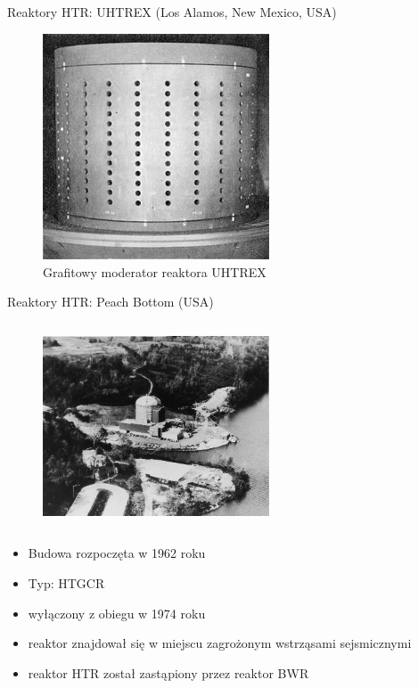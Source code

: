 \begin{frame}{Reaktory HTR: UHTREX (Los Alamos, New Mexico, USA)}
    \begin{figure}
        \centering
        \includegraphics[width=0.6\textwidth, frame]{images/UHTREX_Moderator_graphite.jpg}
        \caption{Grafitowy moderator reaktora UHTREX}
    \end{figure}
\end{frame}



\begin{columnframe}{Reaktory HTR: Peach Bottom (USA)}
    \begin{column}{0.5\textwidth}
        \begin{figure}
            \centering
            \includegraphics[width=0.6\textwidth, frame]{images/peach_bottom_aerial_view.jpg}
        \end{figure}
    \end{column}
    \begin{column}{0.5\textwidth}
        \begin{itemize}
            \item Budowa rozpoczęta w 1962 roku
            \item Typ: HTGCR
            \item wyłączony z obiegu w 1974 roku
            \item reaktor znajdował się w miejscu zagrożonym wstrząsami sejsmicznymi
            \item reaktor HTR został zastąpiony przez reaktor BWR
        \end{itemize}
    \end{column}
\end{columnframe}

